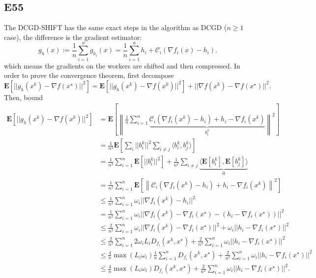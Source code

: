 \documentclass[12pt]{article}
\begin{document}
\subsection*{E55}
The DCGD-SHIFT has the same exact steps in the algorithm as DCGD ($n\geq 1$ case), the difference is the gradient estimator:
\begin{equation}
    g_h(x) := \frac{1}{n} \sum_{i=1}^n g_{h_i}(x) = \frac{1}{n} \sum_{i=1}^n h_i + \mathcal{C}_i(\nabla f_i(x) - h_i).
    \label{dcgd_shift_estimator}
\end{equation}
which means the gradients on the workers are shifted and then compressed. In order to prove the convergence theorem, first decompose
\begin{equation*}
    \mathbf{E}\left[||g_h(x^k) - \nabla f(x^\star) ||^2\right] = \mathbf{E}\left[||g_h(x^k) - \nabla f(x^k) ||^2\right] + ||\nabla f(x^k) - \nabla f(x^\star) ||^2.
\end{equation*}
Then, bound
\begin{equation*}
    \begin{split}
        \mathbf{E}\left[||g_h(x^k) - \nabla f(x^k) ||^2\right] &= \mathbf{E}\left[\left\|\frac{1}{n} \sum_{i=1}^n \underbrace{\mathcal{C}_i(\nabla f_i(x^k) - h_i) + h_i - \nabla f_i(x^k)}_{b_i^k}  \right\|^2\right] \\
        &= \frac{1}{n^2} \mathbf{E}\left[\sum_i ||b_i^k||^2 \sum_{i\neq j} \langle b_i^k, b_j^k\rangle\right] \\
        &= \frac{1}{n^2} \sum_{i=1}^n \mathbf{E}\left[||b_i^k||^2\right] + \frac{1}{n^2} \sum_{i \neq j} \underbrace{\langle \mathbf{E}[b_i^k], \mathbf{E}[b_j^k] \rangle}_{0} \\
        &= \frac{1}{n^2} \sum_{i=1}^n \mathbf{E}\left[\left\| \mathcal{C}_i(\nabla f_i(x^k) - h_i) + h_i - \nabla f_i(x^k) \right\|^2\right] \\
        &\leq \frac{1}{n^2} \sum_{i=1}^n \omega_i || \nabla f_i(x^k) - h_i ||^2 \\
        &= \frac{1}{n^2} \sum_{i=1}^n \omega_i || \nabla f_i(x^k) - \nabla f_i(x^\star) - (h_i - \nabla f_i(x^\star))||^2 \\
        &\leq \frac{2}{n^2} \sum_{i=1}^n \omega_i||\nabla f_i(x^k) - \nabla f_i(x^\star)||^2 + \omega_i || h_i - \nabla f_i(x^\star) ||^2 \\
        &\leq \frac{2}{n^2} \sum_{i=1}^n 2 \omega_i L_i D_{f_i}(x^k,x^\star) + \frac{2}{n^2} \sum_{i=1}^n \omega_i || h_i - \nabla f_i(x^\star) ||^2 \\
        &\leq \frac{4}{n} \max(L_i \omega_i) \frac{1}{n} \sum_{i=1}^n D_{f_i}(x^k, x^\star) + \frac{2}{n^2} \sum_{i=1}^n \omega_i || h_i - \nabla f_i(x^\star) ||^2 \\
        &\leq \frac{4}{n} \max(L_i \omega_i) D_{f_i}(x^k, x^\star) + \frac{2}{n^2} \sum_{i=1}^n \omega_i || h_i - \nabla f_i(x^\star) ||^2.
    \end{split}
\end{equation*}
\end{document}
